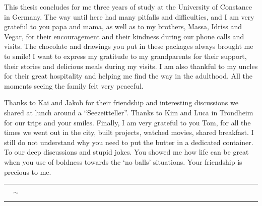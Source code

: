 \documentclass[../main.tex]{subfile}
\begin{document}
This thesis concludes for me three years of study at the University of Constance in Germany. The way until here had many pitfalls and difficulties, and I am very grateful to 
you papa and mama, as well as to my brothers, Massa, Idriss and Vegar, for their encouragement and their kindness during our phone calls and visits. The chocolate and drawings you put in these packages
always brought me to smile! I want to express my gratitude to my grandparents for their support, their stories and delicious meals during my visits. I am also thankful
to my uncles for their great hospitality and helping me find the way in the adulthood. All the moments seeing the family felt very peaceful.

Thanks to Kai and Jakob for their friendship and interesting discussions we shared at lunch around a ``Seezeitteller''. Thanks to Kim and Luca 
in Trondheim for our trips and your smiles. Finally, I am very grateful to you Tom, for all the times we went out in the city, built projects,
watched movies, shared breakfast. I still do not understand why you need to put the butter in a dedicated container. 
To our deep discussions and stupid jokes. You showed me how life can be great when you use of boldness towards the `no balls' situations.
Your friendship is precious to me.

\begin{center}
    \rule{0.1\textwidth}{0.2pt} $\quad\sim\quad$\rule{0.1\textwidth}{0.2pt} 
\end{center}
\end{document}
